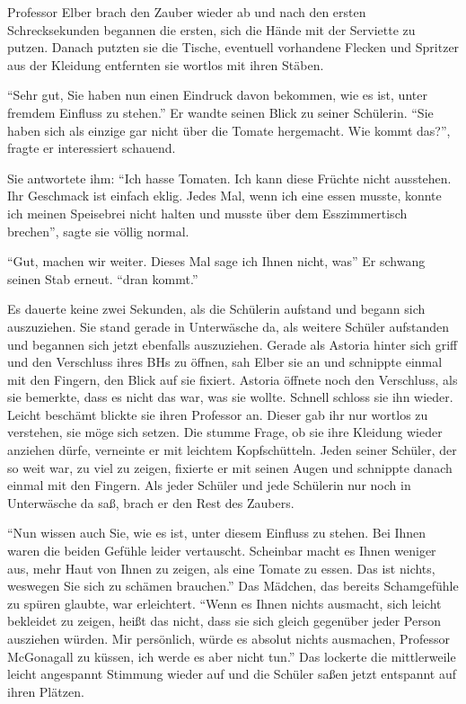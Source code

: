Professor Elber brach den Zauber wieder ab und nach den ersten Schrecksekunden begannen die ersten, sich die Hände mit der Serviette zu putzen. Danach putzten sie die Tische, eventuell vorhandene Flecken und Spritzer aus der Kleidung entfernten sie wortlos mit ihren Stäben.

\enquote{Sehr gut, Sie haben nun einen Eindruck davon bekommen, wie es ist, unter fremdem Einfluss zu stehen.} Er wandte seinen Blick zu seiner Schülerin. \enquote{Sie haben sich als einzige gar nicht über die Tomate hergemacht. Wie kommt das?}, fragte er interessiert schauend.

Sie antwortete ihm: \enquote{Ich hasse Tomaten. Ich kann diese Früchte nicht ausstehen. Ihr Geschmack ist einfach eklig. Jedes Mal, wenn ich eine essen musste, konnte ich meinen Speisebrei nicht halten und musste über dem Esszimmertisch brechen}, sagte sie völlig normal.

\enquote{Gut, machen wir weiter. Dieses Mal sage ich Ihnen nicht, was\abs} Er schwang seinen Stab erneut. \enquote{\aabs dran kommt.}

Es dauerte keine zwei Sekunden, als die Schülerin aufstand und begann sich auszuziehen. Sie stand gerade in Unterwäsche da, als weitere Schüler aufstanden und begannen sich jetzt ebenfalls auszuziehen. Gerade als Astoria hinter sich griff und den Verschluss ihres BHs zu öffnen, sah Elber sie an und schnippte einmal mit den Fingern, den Blick auf sie fixiert. Astoria öffnete noch den Verschluss, als sie bemerkte, dass es nicht das war, was sie wollte. Schnell schloss sie ihn wieder. Leicht beschämt blickte sie ihren Professor an. Dieser gab ihr nur wortlos zu verstehen, sie möge sich setzen. Die stumme Frage, ob sie ihre Kleidung wieder anziehen dürfe, verneinte er mit leichtem Kopfschütteln. Jeden seiner Schüler, der so weit war, zu viel zu zeigen, fixierte er mit seinen Augen und schnippte danach einmal mit den Fingern. Als jeder Schüler und jede Schülerin nur noch in Unterwäsche da saß, brach er den Rest des Zaubers.

\enquote{Nun wissen auch Sie, wie es ist, unter diesem Einfluss zu stehen. Bei Ihnen waren die beiden Gefühle leider vertauscht. Scheinbar macht es Ihnen weniger aus, mehr Haut von Ihnen zu zeigen, als eine Tomate zu essen. \gst Das ist nichts, weswegen Sie sich zu schämen brauchen.} Das Mädchen, das bereits Schamgefühle zu spüren glaubte, war erleichtert. \enquote{Wenn es Ihnen nichts ausmacht, sich leicht bekleidet zu zeigen, heißt das nicht, dass sie sich gleich gegenüber jeder Person ausziehen würden. \gst Mir persönlich, würde es absolut nichts ausmachen, Professor McGonagall zu küssen, ich werde es aber nicht tun.} Das lockerte die mittlerweile leicht angespannt Stimmung wieder auf und die Schüler saßen jetzt entspannt auf ihren Plätzen.

